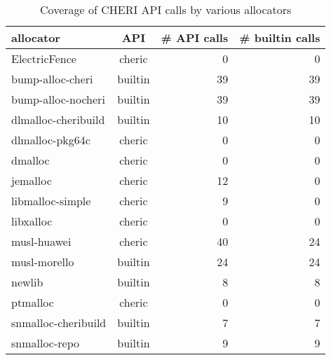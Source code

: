 \begin{table}[t]
\begin{center}
\begin{tabular}{lcrr}
\toprule
allocator & API & \# API calls & \# builtin calls \\
\midrule
ElectricFence & cheric & 0 & 0\\
bump-alloc-cheri & builtin & 39 & 39\\
bump-alloc-nocheri & builtin & 39 & 39\\
dlmalloc-cheribuild & builtin & 10 & 10\\
dlmalloc-pkg64c & cheric & 0 & 0\\
dmalloc & cheric & 0 & 0\\
jemalloc & cheric & 12 & 0\\
libmalloc-simple & cheric & 9 & 0\\
libxalloc & cheric & 0 & 0\\
musl-huawei & cheric & 40 & 24\\
musl-morello & builtin & 24 & 24\\
newlib & builtin & 8 & 8\\
ptmalloc & cheric & 0 & 0\\
snmalloc-cheribuild & builtin & 7 & 7\\
snmalloc-repo & builtin & 9 & 9
\\ \bottomrule
\end{tabular}
\caption{\label{tab:rq1}Coverage of CHERI API calls by various allocators}
\label{tab:atks}
\end{center}
\end{table}